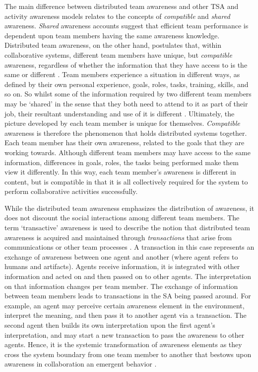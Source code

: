 The main difference between distributed team awareness and other TSA and activity awareness models relates to the concepts of \emph{compatible} and \emph{shared} awareness. \emph{Shared} awareness accounts suggest that efficient team performance is dependent upon team members having the same awareness knowledge. Distributed team awareness, on the other hand, postulates that, within collaborative systems, different team members have unique, but \emph{compatible} awareness, regardless of whether the information that they have access to is the same or different \cite{Stanton2009}. Team members experience a situation in different ways, as defined by their own personal experience, goals, roles, tasks, training, skills, and so on. So whilst some of the information required by two different team members may be `shared' in the sense that they both need to attend to it as part of their job, their resultant understanding and use of it is different \cite{Salmon2010}. Ultimately, the picture developed by each team member is unique for themselves. \emph{Compatible} awareness is therefore the phenomenon that holds distributed systems together. Each team member has their own awareness, related to the goals that they are working towards. Although different team members may have access to the same information, differences in goals, roles, the tasks being performed make them view it differently. In this way, each team member’s awareness is different in content, but is compatible in that it is all collectively required for the system to perform collaborative activities successfully.

While the distributed team awareness emphasizes the distribution of awareness, it does not discount the social interactions among different team members. The term `transactive' awareness is used to describe the notion that distributed team awareness is acquired and maintained through \emph{transactions} that arise from communications or other team processes \cite{Salmon2010}. A transaction in this case represents an exchange of awareness between one agent and another (where agent refers to humans and artifacts). Agents receive information, it is integrated with other information and acted on and then passed on to other agents. The interpretation on that information changes per team member. The exchange of information between team members leads to transactions in the SA being passed around. For example, an agent may perceive certain awareness element in the environment, interpret the meaning, and then pass it to another agent via a transaction. The second agent then builds its own interpretation upon the first agent's interpretation, and may start a new transaction to pass the awareness to other agents. Hence, it is the systemic transformation of awareness elements as they cross the system boundary from one team member to another that bestows upon awareness in collaboration an emergent behavior \cite{Stanton2009}.

